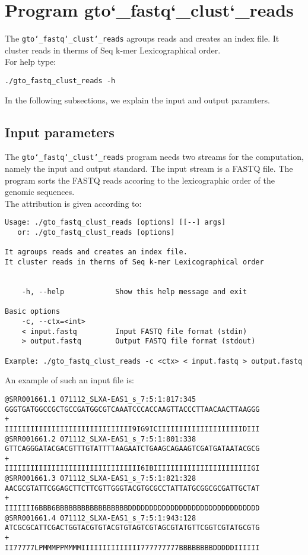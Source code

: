 \section{Program gto\char`_fastq\char`_clust\char`_reads}
The \texttt{gto\char`_fastq\char`_clust\char`_reads} agroups reads and creates an index file. It cluster reads in therms of Seq k-mer Lexicographical order.\\
For help type:
\begin{lstlisting}
./gto_fastq_clust_reads -h
\end{lstlisting}
In the following subsections, we explain the input and output paramters.

\subsection*{Input parameters}

The \texttt{gto\char`_fastq\char`_clust\char`_reads} program needs two streams for the computation, namely the input and output standard. The input stream is a FASTQ file. The program sorts the FASTQ reads accoring to the lexicographic order of the genomic sequences.\\
The attribution is given according to:
\begin{lstlisting}
Usage: ./gto_fastq_clust_reads [options] [[--] args]
   or: ./gto_fastq_clust_reads [options]

It agroups reads and creates an index file.
It cluster reads in therms of Seq k-mer Lexicographical order


    -h, --help            Show this help message and exit

Basic options
    -c, --ctx=<int>       
    < input.fastq         Input FASTQ file format (stdin)
    > output.fastq        Output FASTQ file format (stdout)

Example: ./gto_fastq_clust_reads -c <ctx> < input.fastq > output.fastq
\end{lstlisting}
An example of such an input file is:
\begin{lstlisting}
@SRR001661.1 071112_SLXA-EAS1_s_7:5:1:817:345
GGGTGATGGCCGCTGCCGATGGCGTCAAATCCCACCAAGTTACCCTTAACAACTTAAGGG
+
IIIIIIIIIIIIIIIIIIIIIIIIIIIIII9IG9ICIIIIIIIIIIIIIIIIIIIIDIII
@SRR001661.2 071112_SLXA-EAS1_s_7:5:1:801:338
GTTCAGGGATACGACGTTTGTATTTTAAGAATCTGAAGCAGAAGTCGATGATAATACGCG
+
IIIIIIIIIIIIIIIIIIIIIIIIIIIIIIII6IBIIIIIIIIIIIIIIIIIIIIIIIGI
@SRR001661.3 071112_SLXA-EAS1_s_7:5:1:821:328
AACGCGTATTCGGAGCTTCTTCGTTGGGTACGTGCGCCTATTATGCGGCGCGATTGCTAT
+
IIIIIII6BBB6BBBBBBBBBBBBBBBBBDDDDDDDDDDDDDDDDDDDDDDDDDDDDDDD
@SRR001661.4 071112_SLXA-EAS1_s_7:5:1:943:128
ATCGCGCATTCGACTGGTACGTGTACGTGTAGTCGTAGCGTATGTTCGGTCGTATGCGTG
+
II77777LPMMMPPMMMMIIIIIIIIIIIIII777777777BBBBBBBBDDDDDIIIIII
\end{lstlisting}

